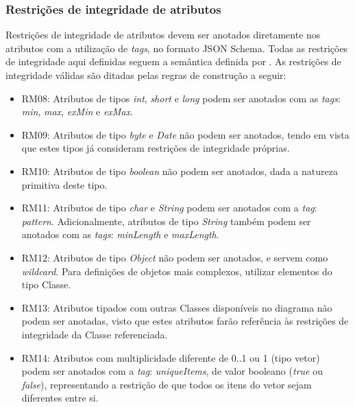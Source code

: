\subsubsection{Restrições de integridade de atributos}

Restrições de integridade de atributos devem ser anotados diretamente nos atributos com a utilização de \textit{tags}, no formato JSON Schema. Todas as restrições de integridade aqui definidas seguem a semântica definida por \cite{PEZOA:2016}. As restrições de integridade válidas são ditadas pelas regras de construção a seguir:

\begin{itemize}
    \item RM08: Atributos de tipos \textit{int}, \textit{short} e \textit{long} podem ser anotados com as \textit{tags}: \textit{min}, \textit{max}, \textit{exMin} e \textit{exMax}.
    
    \item RM09: Atributos de tipo \textit{byte} e \textit{Date} não podem ser anotados, tendo em vista que estes tipos já consideram restrições de integridade próprias.
    
    \item RM10: Atributos de tipo \textit{boolean} não podem ser anotados, dada a natureza primitiva deste tipo.
    
    \item RM11: Atributos de tipo \textit{char} e \textit{String} podem ser anotados com a \textit{tag}: \textit{pattern}. Adicionalmente, atributos de tipo \textit{String} também podem ser anotados com as \textit{tags}: \textit{minLength} e \textit{maxLength}.
    
    \item RM12: Atributos de tipo \textit{Object} não podem ser anotados, e servem como \textit{wildcard}. Para definições de objetos mais complexos, utilizar elementos do tipo Classe.
    
    \item RM13: Atributos tipados com outras Classes disponíveis no diagrama não podem ser anotadas, visto que estes atributos farão referência às restrições de integridade da Classe referenciada.
    
    \item RM14: Atributos com multiplicidade diferente de 0..1 ou 1 (tipo vetor) podem ser anotados com a \textit{tag}: \textit{uniqueItems}, de valor booleano (\textit{true} ou \textit{false}), representando a restrição de que todos os itens do vetor sejam diferentes entre si.
\end{itemize}


